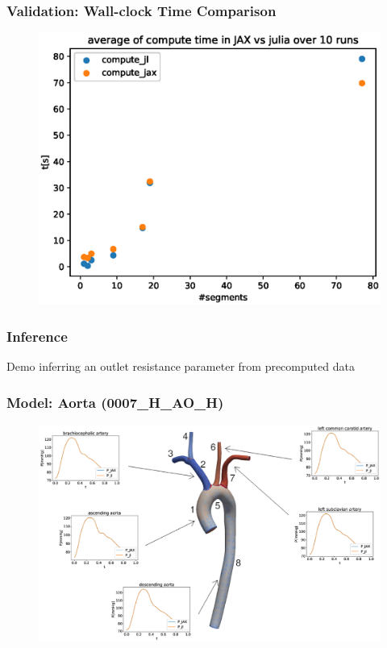 \documentclass{beamer}
\begin{document}
	\begin{frame}
		\frametitle{Validation: Wall-clock Time Comparison}
		\begin{figure} [H]
			\centering
			\includegraphics[width=0.94\columnwidth]{images/comparison.eps}
			\label{fig:comparison}
		\end{figure}

	\end{frame}
	\begin{frame}
		\frametitle{Inference}
		\begin{block}{Demo}
			inferring an outlet resistance parameter from precomputed data
		\end{block}
	\end{frame}
	\begin{frame}
		\frametitle{Model: Aorta (0007\_H\_AO\_H)}
		\begin{figure} [H]
			\centering
			\includegraphics[width=\columnwidth]{images/0007.eps}
			\label{fig:aorta}
		\end{figure}
	\end{frame}
\end{document}
